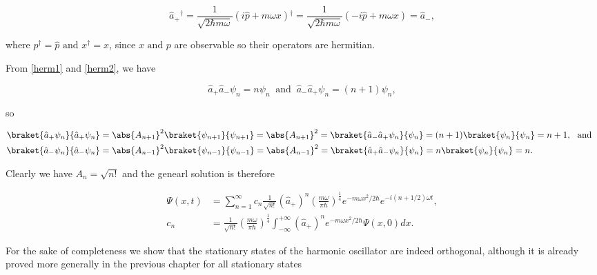 \documentclass[a4paper,12pt]{report}
\begin{document}
\begin{equation}
  \hat{a} _{+}{}^{\dagger}  = \frac{1}{\sqrt{2 \hbar m \omega } } (i \hat{p} + m \omega x){}^{\dagger}  = \frac{1}{\sqrt{2\hbar m \omega } } (-i \hat{p} + m \omega x) = \hat{a}  _{-},  
\end{equation}

where \(\hat{p} {}^{\dagger} = \hat{p} \text { and } x^{\dagger} = x\), since \(x \text { and } p\) are observable so their operators are hermitian.  

From \cref{herm1} and \cref{herm2}, we have 

\begin{equation}
  \hat{a} _{+} \hat{a} _{-} \psi _{n} = n \psi _{n} ~\text { and }~ \hat{a} _{-}\hat{a} _{+ }\psi _{n} = (n+1)\psi _{n},        
\end{equation}

so 

\begin{equation}
  \begin{aligned} 
  \braket{\hat{a} _{+}\psi _{n}  }{\hat{a} _{+}\psi _{n}  } &= \abs{A_{n+1} }^2 \braket{\psi _{n+1} }{\psi _{n+1} } = \abs{A_{n+1} }^2  = \braket{\hat{a} _{-}\hat{a} _{+}\psi _{n}   }{\psi _{n} } = (n+1) \braket{\psi _{n} }{\psi _{n} } = n+1, ~\text { and }~ \\
  \braket{\hat{a} _{-}\psi _{n}  }{\hat{a} _{-}\psi _{n}  } &= \abs{A_{n-1} }^2 \braket{\psi _{n-1} }{\psi _{n-1} } = \abs{A_{n-1} }^2  = \braket{\hat{a} _{+}\hat{a} _{-}\psi _{n}   }{\psi _{n} } = n \braket{\psi _{n} }{\psi _{n} } = n.
  \end{aligned} 
\end{equation}

Clearly we have \(A_{n} = \sqrt{n!}  \) and the genearl solution is therefore

\begin{equation}
  \begin{aligned} 
  \Psi (x,t) &= \sum_{n=1}^{\infty} c_{n}\frac{1}{\sqrt{n!} } (\hat{a} _{+} )^{n} \left( \frac{m \omega }{\pi \hbar }  \right)^{\frac{1}{4} } e^{- m \omega x^2/2 \hbar }   e^{-i(n+1/2)\omega t}, \\
  c_{n} &= \frac{1}{\sqrt{n!} } \left( \frac{m \omega }{\pi \hbar }  \right)^{\frac{1}{4} } \int_{-\infty}^{+\infty} (\hat{a} _{+} )^{n} e^{- m \omega x^2/2 \hbar } \Psi (x,0)dx.
  \end{aligned}         
\end{equation}

For the sake of completeness we show that the stationary states of the harmonic oscillator are indeed orthogonal, although it is already proved more generally in the previous chapter for all stationary states
\end{document}
